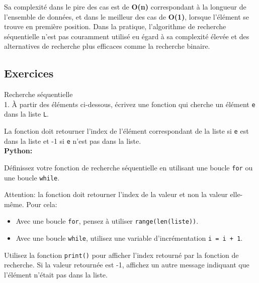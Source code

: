     Sa complexité dans le pire des cas est de \textbf{O(n)} correspondant à la longueur de l'ensemble de données, et dans le meilleur des cas de \textbf{O(1)}, lorsque l'élément se trouve en première position. Dans la pratique, l'algorithme de recherche séquentielle n'est pas couramment utilisé eu égard à sa complexité élevée et des alternatives de recherche plus efficaces comme la recherche binaire.\\
    
    
    \subsection{Exercices}
    
    \begin{Exercice}[20 minutes] [Python] Recherche séquentielle\\
    
    1. À partir des éléments ci-dessous, écrivez une fonction qui cherche un élément \texttt{e} dans la liste \texttt{L}. \newline 
    
    La fonction doit retourner l'index de l'élément correspondant de la liste si \texttt{e} est dans la liste et -1 si \texttt{e} n'est pas dans la liste.\\
    
    \textbf{Python:}
      


\begin{conseil}
    Définissez votre fonction de recherche séquentielle en utilisant une boucle \lstinline{for} ou une boucle \lstinline{while}.
    
    Attention: la fonction doit retourner l'index de la valeur et non la valeur elle-même. Pour cela:
    \begin{itemize}
        \item Avec une boucle \lstinline{for}, pensez à utiliser \lstinline{range(len(liste))}.
        \item Avec une boucle \lstinline{while}, utilisez une variable d'incrémentation \lstinline{i = i + 1}.
    \end{itemize}
    Utilisez la fonction \lstinline{print()} pour afficher l'index retourné par la fonction de recherche. Si la valeur retournée est -1, affichez un autre message indiquant que l'élément n'était pas dans la liste.  
\end{conseil}
    

\end{Exercice}
